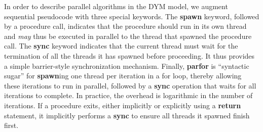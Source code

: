 In order to describe parallel algorithms in the DYM model, we augment sequential
pseudocode with three special keywords.
The {\bf spawn} keyword, followed by a procedure call, indicates that the
procedure should run in its own thread and {\em may} thus be executed in
parallel to the thread that spawned the procedure call.
The {\bf sync} keyword indicates that the current thread must wait for the
termination of all the threads it has spawned before proceeding.
It thus provides a simple barrier-style synchronization mechanism.
Finally, {\bf parfor} is ``syntactic sugar'' for {\bf spawn}ing one thread per
iteration in a for loop, thereby allowing these iterations to run in parallel,
followed by a {\bf sync} operation that waits for all iterations to complete.
In practice, the overhead is logarithmic in the number of iterations.
If a procedure exits, either implicitly or explicitly using a {\bf return}
statement, it implicitly performs a {\bf sync} to ensure all threads it spawned
finish first.
